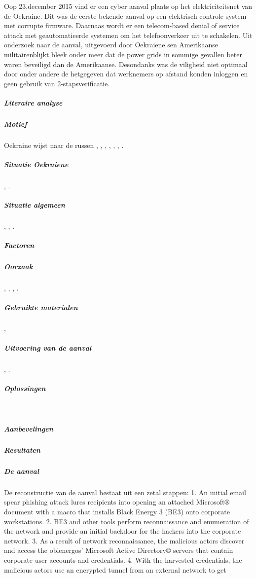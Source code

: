 Oop 23,december 2015  vind er een cyber aanval plaats op het elektriciteitsnet van de Oekraine. Dit was de eerste bekende aanval op een elektrisch controle  system met corrupte firmware. Daarnaas wordt er een telecom-based denial of service attack met  geautomatieerde systemen om het telefoonverkeer uit te schakelen.
\cite{Whitehead2017ukrainepoweroutage}
Uit onderzoek\cite{zetter2016GridHack} naar de aanval,  uitgevoerd door Oekraiene sen Amerikaanse militairenblijkt  bleek onder meer dat de power grids in sommige gevallen beter waren beveiligd dan de Amerikaanse. Desondanks was de viligheid niet optimaal door onder andere de  hetgegeven dat werknemers op afstand konden inloggen en geen gebruik van 2-stapsverificatie.
\subparagraph{Literaire analyse}
\subparagraph{Motief}
Oekraine wijst naar de russen \cite{zetter2016GridHack}, 
\cite{greenberg2017Cyberwartestlab},
\cite{boozallen2016lightwentout},
\cite{finkle08012016russiansandwormhackers},
\cite{zinets15022017ukrainechargesrussia},
\cite{mcelfresh2016cyberattackhowandwhy},
\cite{parkwalstorm11102017russiagridattack}.
\subparagraph{Situatie Oekraiene}
\cite{drago2017CrashOverride},
\cite{slowik2019ReassasUkraine2016Attack}.
\subparagraph{Situatie algemeen}
\cite{cerulus2019FrontlineRussiaAttack},
\cite{desarnaud2017cyberattacks},
\cite{dragos2019TargetedTransStation}.
\subparagraph{Factoren}
\cite{shehod2016gridadvantageus}
\subparagraph{Oorzaak}
\cite{rocha2017cybersecyrityanalysisScada},
\cite{2017crashoverridenostuxnet},
\cite{vijayan2017firstmalwareCausedOutage},
\cite{slowik2019ReassasUkraine2016Attack}.
\subparagraph{Gebruikte materialen}
\cite{2015ukrainegridattack},
\cite{industroyershortfact}
\subparagraph{Uitvoering van de aanval}
\cite{Whitehead2017ukrainepoweroutage},
\cite{boozallen2016lightwentout}.
\subparagraph{Oplossingen}
~\cite{Whitehead2017ukrainepoweroutage}
\subparagraph{Aanbevelingen}
\subparagraph{Resultaten}
\subparagraph{De aanval}
De reconstructie van de aanval bestaat uit een zetal stappen:
1. An initial email spear phishing attack lures recipients
into opening an attached Microsoft® document with a
macro that installs Black Energy 3 (BE3) onto
corporate workstations.
2. BE3 and other tools perform reconnaissance and
enumeration of the network and provide an initial
backdoor for the hackers into the corporate network.
3. As a result of network reconnaissance, the malicious
actors discover and access the oblenergos’ Microsoft
Active Directory® servers that contain corporate user
accounts and credentials.
4. With the harvested credentials, the malicious actors use
an encrypted tunnel from an external network to get
